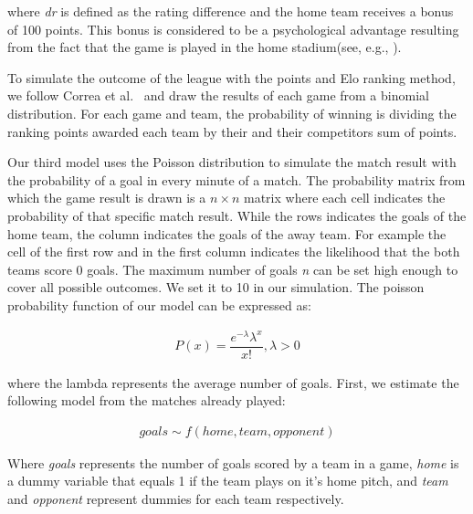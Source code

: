 \documentclass[12pt,a4paper]{article}
\begin{document}
where \emph{dr} is defined as the rating difference and the home team
receives a bonus of 100 points. This bonus is considered to be a
psychological advantage resulting from the fact that the game is played
in the home stadium(see, e.g., \textcite{Pollard2008}).

To simulate the outcome of the league with the points and Elo ranking
method, we follow Correa et al.~\autocite*{correa} and draw the results
of each game from a binomial distribution. For each game and team, the
probability of winning is dividing the ranking points awarded each team
by their and their competitors sum of points.

Our third model uses the Poisson distribution to simulate the match
result with the probability of a goal in every minute of a match. The
probability matrix from which the game result is drawn is a
\(n \times n\) matrix where each cell indicates the probability of that
specific match result. While the rows indicates the goals of the home
team, the column indicates the goals of the away team. For example the
cell of the first row and in the first column indicates the likelihood
that the both teams score \(0\) goals. The maximum number of goals
\emph{n} can be set high enough to cover all possible outcomes. We set
it to 10 in our simulation. The poisson probability function of our
model can be expressed as:

\begin{align}
P(x) = \dfrac{e^{-\lambda}\lambda^x}{x!}, \lambda > 0
\end{align}

where the lambda represents the average number of goals. First, we
estimate the following model from the matches already played:

\begin{align}
goals \sim f(home, team, opponent)
\end{align}

Where \emph{goals} represents the number of goals scored by a team in a
game, \emph{home} is a dummy variable that equals 1 if the team plays on
it's home pitch, and \emph{team} and \emph{opponent} represent dummies
for each team respectively.
\end{document}
